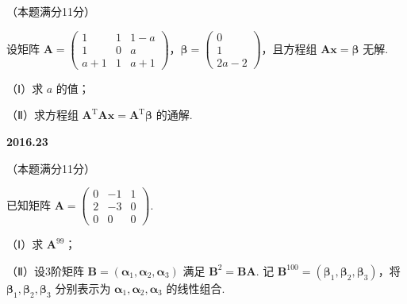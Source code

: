 \documentclass[UTF8,12pt,fontset=windows]{ctexart}
\begin{document}
（本题满分11分）

设矩阵 $\boldsymbol{A} = \begin{pmatrix} 1 & 1 & 1-a \\ 1 & 0 & a \\ a+1 & 1 & a+1 \end{pmatrix}$，$\boldsymbol{\beta} = \begin{pmatrix} 0 \\ 1 \\ 2a-2 \end{pmatrix}$，且方程组 $\boldsymbol{Ax} = \boldsymbol{\beta}$ 无解.

（Ⅰ）求 $a$ 的值；

（Ⅱ）求方程组 $\boldsymbol{A}^{\mathrm{T}}\boldsymbol{Ax} = \boldsymbol{A}^{\mathrm{T}}\boldsymbol{\beta}$ 的通解.

\vfill
\newpage
{\large\bfseries 2016.23}

（本题满分11分）

已知矩阵 $\boldsymbol{A} = \begin{pmatrix} 0 & -1 & 1 \\ 2 & -3 & 0 \\ 0 & 0 & 0 \end{pmatrix}$.

（Ⅰ）求 $\boldsymbol{A}^{99}$；

（Ⅱ）设3阶矩阵 $\boldsymbol{B} = (\boldsymbol{\alpha}_1, \boldsymbol{\alpha}_2, \boldsymbol{\alpha}_3)$ 满足 $\boldsymbol{B}^2 = \boldsymbol{BA}$. 记 $\boldsymbol{B}^{100} = (\boldsymbol{\beta}_1, \boldsymbol{\beta}_2, \boldsymbol{\beta}_3)$，将 $\boldsymbol{\beta}_1, \boldsymbol{\beta}_2, \boldsymbol{\beta}_3$ 分别表示为 $\boldsymbol{\alpha}_1, \boldsymbol{\alpha}_2, \boldsymbol{\alpha}_3$ 的线性组合.

\vfill
\end{document}
